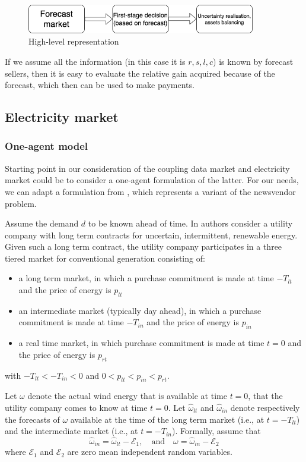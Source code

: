 \documentclass{article}
\begin{document}
\begin{figure}[h]
    \centering
    \includegraphics[width = 100mm]{high_level_steps.png}
    \caption{High-level representation }
    \label{fig:1}
\end{figure}

If we assume all the information (in this case it is $r, s, l, c$) is known by forecast sellers, then it is easy to evaluate the relative gain acquired because of the forecast, which then can be used to make payments.



\subsection{Electricity market}
\subsubsection{One-agent model}
Starting point in our consideration of the coupling data market and electricity market could be to consider a one-agent formulation of the latter. For our needs, we can adapt a formulation from \cite{nair}, which represents a variant of the newsvendor problem. 

Assume the demand $d$ to be known ahead of time. In \cite{nair} authors consider a utility company with long term contracts for uncertain, intermittent, renewable energy. Given such a long term contract, the utility company participates in a three tiered market for conventional generation consisting of: 
\begin{itemize}
    \item a long term market, in which a purchase commitment is made at time $-T_{lt}$ and the price of energy is $p_{lt}$
    
    \item an intermediate market (typically day ahead), in which a purchase commitment is made at time $-T_{in}$ and the price of energy is $p_{in}$
    
    \item a real time market, in which purchase commitment is made at time $t = 0$ and the price of energy is $p_{rt}$
\end{itemize}
with $-T_{lt} < -T_{in} < 0$ and $0 < p_{lt} < p_{in} < p_{rt}$.

Let $\omega$ denote the actual wind energy that is available at time $t = 0$, that  the utility company comes to know at time $t = 0$. Let $\hat{\omega}_{lt}$ and $\hat{\omega}_{in}$ denote respectively the
forecasts of $\omega$ available at the time of the long term market (i.e., at $t = -T_{lt}$) and the intermediate market (i.e., at $t = -T_{in}$). Formally,  assume that
\begin{equation*}
    \hat{\omega}_{in} = \hat{\omega}_{lt} - \mathcal{E}_1, \quad \text{and}  \quad \omega = \hat{\omega}_{in} - \mathcal{E}_2 
\end{equation*}
where $\mathcal{E}_1$ and $\mathcal{E}_2$ are zero mean independent random variables. 
\end{document}
